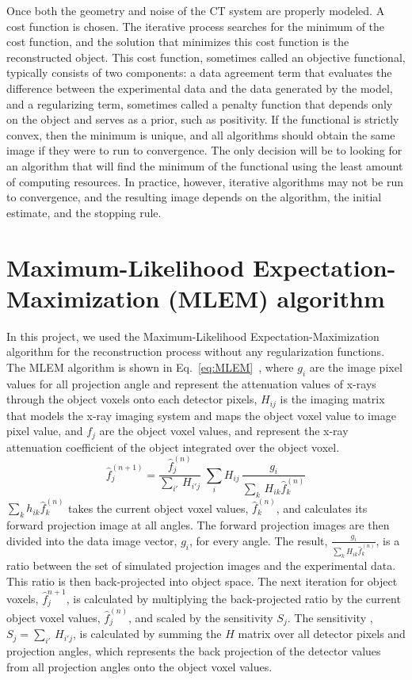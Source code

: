 Once both the geometry and noise of the CT system are properly modeled.  A cost function is chosen.  The iterative process searches for the minimum of the cost function, and the solution that minimizes this cost function is the reconstructed object.  This cost function, sometimes called an objective functional, typically consists of two components: a data agreement term that evaluates the difference between the experimental data and the data generated by the model, and a regularizing term, sometimes called a penalty function that depends only on the object and serves as a prior, such as positivity.  If the functional is strictly convex, then the minimum is unique, and all algorithms should obtain the same image if they were to run to convergence.  The only decision will be to looking for an algorithm that will find the minimum of the functional using the least amount of computing resources.  In practice, however, iterative algorithms may not be run to convergence, and the resulting image depends on the algorithm, the initial estimate, and the stopping rule.

\section{Maximum-Likelihood Expectation-Maximization (MLEM) algorithm }
In this project, we used the Maximum-Likelihood Expectation-Maximization algorithm for the reconstruction process without any regularization functions.  The MLEM algorithm is shown in Eq.~\ref{eq:MLEM}~\citep{EmissionTom2004}, where $g_i$ are the image pixel values for all projection angle and represent the attenuation values of x-rays through the object voxels onto each detector pixels, $H_{ij}$ is the imaging matrix that models the x-ray imaging system and maps the object voxel value to image pixel value, and $f_{j}$ are the object voxel values, and represent the x-ray attenuation coefficient of the object integrated over the object voxel.
%
\begin{equation}
\hat{f}^{(n+1)}_{j} = \frac{\hat{f}^{(n)}_j}{{\sum\limits_{i'}} \, H_{i'j}} \; 
						\sum\limits_{i} H_{ij} \, \frac{g_{i}}{\sum\limits_{k} \, H_{ik} \hat{f}_{k}^{(n)}}
\label{eq:MLEM}
\end{equation}
%
$\sum\limits_k h_{ik} \hat{f}_k^{(n)}$ takes the current object voxel values, $\hat{f}^{(n)}_k$, and calculates its forward projection image at all angles.  The forward projection images are then divided into the data image vector, $g_i$, for every angle.  The result, $\frac{g_i}{\sum\limits_k H_{ik} \hat{f}_k^{(n)}}$, is a ratio between the set of simulated projection images and the experimental data.  This ratio is then back-projected into object space.  The next iteration for object voxels, $\hat{f}_j^{n+1}$, is calculated by multiplying the back-projected ratio by the current object voxel values, $\hat{f}_j^{(n)}$, and scaled by the sensitivity $S_j$.  The sensitivity , $S_j = \sum\limits_{i'} \, H_{i' j}$, is calculated by summing the $H$ matrix over all detector pixels and projection angles, which represents the back projection of the detector values from all projection angles onto the object voxel values.

